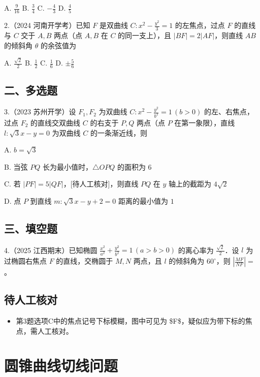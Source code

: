 \documentclass[UTF8,a4paper,11pt]{ctexart}
\begin{document}
A. $\frac{9}{16}$ \qquad B. $\frac{3}{4}$ \qquad C. $-\frac{4}{3}$ \qquad D. $\frac{4}{5}$

2.（2024 河南开学考）已知 $F$ 是双曲线 $C:x^2-\frac{y^2}{3}=1$ 的左焦点，过点 $F$ 的直线与 $C$ 交于 $A,B$ 两点（点 $A,B$ 在 $C$ 的同一支上），且 $|BF|=2|AF|$，则直线 $AB$ 的倾斜角 $\theta$ 的余弦值为

A. $\frac{\sqrt{2}}{2}$ \qquad B. $\frac{1}{2}$ \qquad C. $\frac{1}{6}$ \qquad D. $\pm\frac{5}{6}$

\subsection*{二、多选题}

3.（2023 苏州开学）设 $F_1,F_2$ 为双曲线 $C:x^2-\frac{y^2}{b^2}=1\,(b>0)$ 的左、右焦点，过点 $F_2$ 的直线交双曲线 $C$ 的右支于 $P,Q$ 两点（点 $P$ 在第一象限），直线 $l:\sqrt{3}x-y=0$ 为双曲线 $C$ 的一条渐近线，则

A. $b=\sqrt{3}$

B. 当弦 $PQ$ 长为最小值时，$\triangle OPQ$ 的面积为 $6$

C. 若 $|PF|=5|QF|$，[待人工核对]，则直线 $PQ$ 在 $y$ 轴上的截距为 $4\sqrt{2}$

D. 点 $P$ 到直线 $m:\sqrt{3}x-y+2=0$ 距离的最小值为 $1$

\subsection*{三、填空题}

4.（2025 江西期末）已知椭圆 $\frac{x^2}{a^2}+\frac{y^2}{b^2}=1\,(a>b>0)$ 的离心率为 $\frac{\sqrt{2}}{2}$．设 $l$ 为过椭圆右焦点 $F$ 的直线，交椭圆于 $M,N$ 两点，且 $l$ 的倾斜角为 $60^\circ$，则 $\left|\frac{MF}{NF}\right|=$\underline{\qquad\qquad}。

\subsection*{待人工核对}

\begin{itemize}

\item 第3题选项C中的焦点记号下标模糊，图中可见为 \$F\$，疑似应为带下标的焦点，需人工核对。

\end{itemize}

\clearpage

\section{圆锥曲线切线问题}
\end{document}
